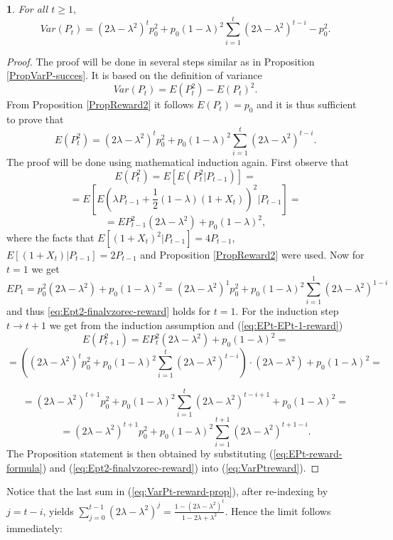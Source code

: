 \documentclass{amsart}
\theoremstyle{definition}
\theoremstyle{plain}
\newtheorem{prop}[thm]{\protect\propositionname}
\theoremstyle{plain}
\theoremstyle{plain}
\numberwithin{equation}{section}
\providecommand{\propositionname}{Proposition}
\begin{document}
\begin{prop}
For all $t\geq1,$
\begin{equation}
Var(P_{t})=(2\lambda-\lambda^{2})^{t}p_{0}^{2}+p_{0}(1-\lambda)^{2}\sum_{i=1}^{t}(2\lambda-\lambda^{2})^{t-i}-p_{0}^{2}.\label{eq:VarPt-reward-prop}
\end{equation}
\end{prop}
\begin{proof}
The proof will be done in several steps similar as in Proposition
\ref{PropVarP-succes}. It is based on the definition of variance
\begin{equation}
Var(P_{t})=E(P_{t}^{2})-E(P_{t})^{2}.\label{eq:VarPtreward}
\end{equation}
From Proposition \ref{PropReward2} it follows $E(P_{t})=p_{0}$ and
it is thus sufficient to prove that
\begin{equation}
E(P_{t}^{2})=(2\lambda-\lambda^{2})^{t}p_{0}^{2}+p_{0}(1-\lambda)^{2}\sum_{i=1}^{t}(2\lambda-\lambda^{2})^{t-i}.\label{eq:Ept2-finalvzorec-reward}
\end{equation}
The proof will be done using mathematical induction again. First observe that
\[
E(P_{t}^{2})=E[E(P_{t}^{2}|P_{t-1})]=
\]
\[
=E[E(\lambda P_{t-1}+\frac{1}{2}(1-\lambda)(1+X_{t}))^{2}|P_{t-1}]=
\]
\begin{equation}
=EP_{t-1}^{2}(2\lambda-\lambda^{2})+p_{0}(1-\lambda)^{2},\label{eq:EPt-EPt-1-reward}
\end{equation}
where the facts that $E[(1+X_{t})^{2}|P_{t-1}]=4P_{t-1}$, $E[(1+X_{t})|P_{t-1}]=2P_{t-1}$
and Proposition \ref{PropReward2} were used. Now for $t=1$ we get
\[
EP_{1}=p_{0}^{2}(2\lambda-\lambda^{2})+p_{0}(1-\lambda)^{2}=(2\lambda-\lambda^{2})^{1}p_{0}^{2}+p_{0}(1-\lambda)^{2}\sum_{i=1}^{1}(2\lambda-\lambda^{2})^{1-i}
\]
and thus \eqref{eq:Ept2-finalvzorec-reward} holds for $t=1$. For the induction step $t\rightarrow t+1$
we get from the induction assumption and (\ref{eq:EPt-EPt-1-reward})
\[
E(P_{t+1}^{2})=EP_{t}^{2}(2\lambda-\lambda^{2})+p_{0}(1-\lambda)^{2}=
\]
\[
=((2\lambda-\lambda^{2})^{t}p_{0}^{2}+p_{0}(1-\lambda)^{2}\sum_{i=1}^{t}(2\lambda-\lambda^{2})^{t-i})\cdot(2\lambda-\lambda^{2})+p_{0}(1-\lambda)^{2}=
\]

\[
=(2\lambda-\lambda^{2})^{t+1}p_{0}^{2}+p_{0}(1-\lambda)^{2}\sum_{i=1}^{t}(2\lambda-\lambda^{2})^{t-i+1}+p_{0}(1-\lambda)^{2}=
\]
\[
=(2\lambda-\lambda^{2})^{t+1}p_{0}^{2}+p_{0}(1-\lambda)^{2}\sum_{i=1}^{t+1}(2\lambda-\lambda^{2})^{t+1-i}.
\]
The Proposition statement is then obtained by substituting (\ref{eq:EPt-reward-formula})
and (\ref{eq:Ept2-finalvzorec-reward}) into (\ref{eq:VarPtreward}).
\end{proof}
Notice that the last sum in (\ref{eq:VarPt-reward-prop}), after re-indexing
by $j=t-i$, yields $\sum_{j=0}^{t-1}(2\lambda-\lambda^{2})^{j}=\frac{1-(2\lambda-\lambda^{2})^{t}}{1-2\lambda+\lambda^{2}}$.
Hence the limit follows immediately:
\end{document}
